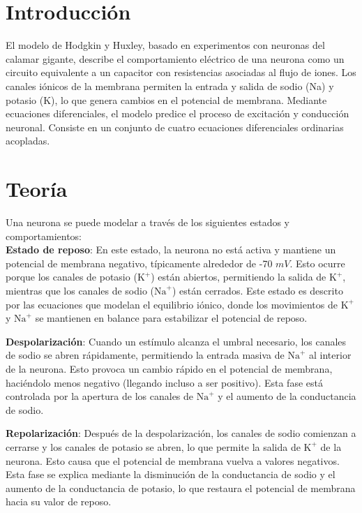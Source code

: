 \documentclass[aps,prl,twocolumn,groupedaddress]{revtex4-2}
\begin{document}
\section{Introducción}

El modelo de Hodgkin y Huxley, basado en experimentos con neuronas del calamar gigante, describe el comportamiento eléctrico de una neurona como un circuito equivalente a un capacitor con resistencias asociadas al flujo de iones. Los canales iónicos de la membrana permiten la entrada y salida de sodio (Na) y potasio (K), lo que genera cambios en el potencial de membrana. Mediante ecuaciones diferenciales, el modelo predice el proceso de excitación y conducción neuronal.
Consiste en un conjunto de cuatro ecuaciones diferenciales ordinarias acopladas.~\cite{HodgkinyHuxleyWikipedia}
\section{Teoría}

Una neurona se puede modelar a través de los siguientes estados y comportamientos:\\

\textbf{Estado de reposo}: En este estado, la neurona no está activa y mantiene un potencial de membrana negativo, típicamente alrededor de -70 $mV$. Esto ocurre porque los canales de potasio ($\mathrm{K}^+$) están abiertos, permitiendo la salida de $\mathrm{K}^+$, mientras que los canales de sodio ($\mathrm{Na}^+$) están cerrados. Este estado es descrito por las ecuaciones que modelan el equilibrio iónico, donde los movimientos de $\mathrm{K}^+$ y $\mathrm{Na}^+$ se mantienen en balance para estabilizar el potencial de reposo.

\textbf{Despolarización}: Cuando un estímulo alcanza el umbral necesario, los canales de sodio se abren rápidamente, permitiendo la entrada masiva de $\mathrm{Na}^+$ al interior de la neurona. Esto provoca un cambio rápido en el potencial de membrana, haciéndolo menos negativo (llegando incluso a ser positivo). Esta fase está controlada por la apertura de los canales de $\mathrm{Na}^+$ y el aumento de la conductancia de sodio.

\textbf{Repolarización}: Después de la despolarización, los canales de sodio comienzan a cerrarse y los canales de potasio se abren, lo que permite la salida de $\mathrm{K}^+$ de la neurona. Esto causa que el potencial de membrana vuelva a valores negativos. Esta fase se explica mediante la disminución de la conductancia de sodio y el aumento de la conductancia de potasio, lo que restaura el potencial de membrana hacia su valor de reposo.\\
\end{document}
